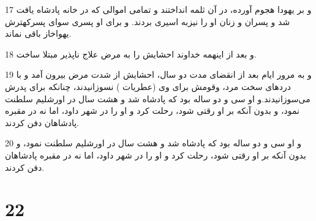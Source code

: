 \par 17 و بر یهودا هجوم آورده، در آن ثلمه انداختند و تمامی اموالی که در خانه پادشاه یافت شد و پسران و زنان او را نیزبه اسیری بردند. و برای او پسری سوای پسرکهترش یهواخاز باقی نماند.
\par 18 و بعد از اینهمه خداوند احشایش را به مرض علاج ناپذیر مبتلا ساخت.
\par 19 و به مرور ایام بعد از انقضای مدت دو سال، احشایش از شدت مرض بیرون آمد و با دردهای سخت مرد، وقومش برای وی (عطریات ) نسوزانیدند، چنانکه برای پدرش می‌سوزانیدند.و او سی و دو ساله بود که پادشاه شد و هشت سال در اورشلیم سلطنت نمود، و بدون آنکه بر او رقتی شود، رحلت کرد و او را در شهر داود، اما نه در مقبره پادشاهان دفن کردند.
\par 20 و او سی و دو ساله بود که پادشاه شد و هشت سال در اورشلیم سلطنت نمود، و بدون آنکه بر او رقتی شود، رحلت کرد و او را در شهر داود، اما نه در مقبره پادشاهان دفن کردند.
 
\chapter{22}

